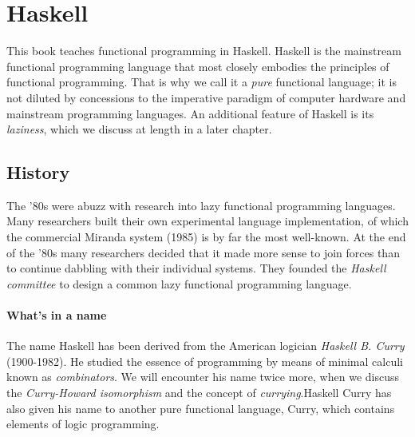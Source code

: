 
\section{Haskell}

This book teaches functional programming in Haskell. Haskell is the mainstream
functional programming language that most closely embodies the principles of
functional programming.  That is why we call it a \emph{pure} functional
language; it is not diluted by concessions to the imperative paradigm of
computer hardware and mainstream programming languages. An additional feature
of Haskell is its \emph{laziness}, which we discuss at length in a later
chapter.

\subsection{History}

The '80s were abuzz with research into lazy functional programming languages.
Many researchers built their own experimental language implementation, of which 
the commercial Miranda system (1985) is by far the most well-known.
At the end of the '80s many researchers decided that it made more sense to join
forces than to continue dabbling with their individual systems. They founded the
\emph{Haskell committee} to design a common lazy functional programming language.

\begin{sidenote}
\paragraph{What's in a name}
The name Haskell has been derived from the American logician
\emph{Haskell B. Curry}
(1900-1982). He studied the essence of programming by means of minimal calculi known as
\emph{combinators}. We will encounter his name twice more, when we discuss the 
\emph{Curry-Howard isomorphism} and the concept of \emph{currying}.\footnotemark[1] Haskell Curry has also given his name to another pure functional language,
Curry, which contains elements of logic programming.
\ \footnoterule \ \\
{\footnotesize{}}
\end{sidenote}

